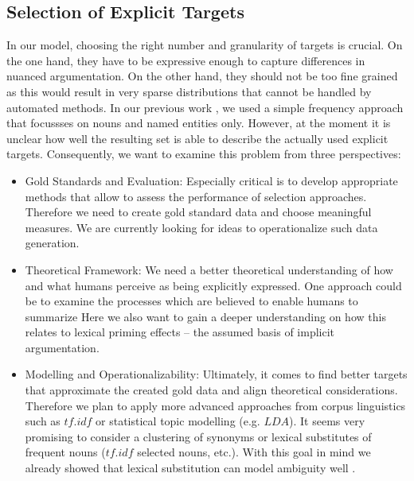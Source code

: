 \documentclass[11pt]{article}
\begin{document}
\subsection{Selection of Explicit Targets}
In our model, choosing the right number and granularity of targets is crucial.
On the one hand, they have to be expressive enough to capture differences in nuanced argumentation.
On the other hand, they should not be too fine grained as this would result in very sparse distributions that cannot be handled by automated methods.
In our previous work \cite{wojatzki2016stanceBased}, we used a simple frequency approach that focussses on nouns and named entities only.
However, at the moment it is unclear how well the resulting set is able to describe the actually used explicit targets. 
Consequently, we want to examine this problem from three perspectives:
\begin{itemize}
  \item Gold Standards and Evaluation: Especially critical is to develop appropriate methods that allow to assess the performance of selection approaches. Therefore we need to create gold standard data and choose meaningful measures. We are currently looking for ideas to operationalize such data generation. 
  \item Theoretical Framework: We need a better theoretical understanding of how and what humans perceive as being explicitly expressed. One approach could be to examine the processes which are believed to enable humans to summarize Here we also want to gain a deeper understanding on how this relates to lexical priming effects -- the assumed basis of implicit argumentation.
  \item Modelling and Operationalizability: Ultimately, it comes to find better targets that approximate  the created gold data and align theoretical considerations. Therefore we plan to apply more advanced approaches from corpus linguistics such as $tf.idf$ or statistical topic modelling (e.g. $LDA$). It seems very promising to consider a clustering of synonyms or lexical substitutes of frequent nouns ($tf.idf$ selected nouns, etc.). With this goal in mind we already showed that lexical substitution can model ambiguity well \cite{wojatzki2016bundled}.
\end{itemize}
\end{document}
